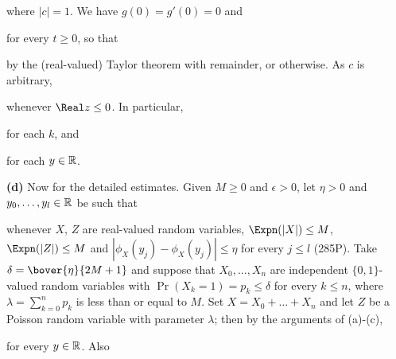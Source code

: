 {

\noindent where $|c|=1$.   We have $g(0)=g'(0)=0$ and


\noindent for every $t\ge 0$, so that


\noindent by the (real-valued) Taylor theorem with remainder, or
otherwise.   As $c$ is arbitrary,


\noindent whenever $\Real z\le 0$.   In particular,


\noindent for each $k$, and


\noindent for each $y\in\Bbb R$.

\medskip

{\bf (d)} Now for the detailed estimates.   Given $M\ge 0$ and
$\epsilon>0$, let $\eta>0$ and $y_0,\ldots,y_l\in\Bbb R$ be such that


\noindent whenever $X$, $Z$ are real-valued random variables,
$\Expn(|X|)\le M$, $\Expn(|Z|)\le M$ and
$|\phi_X(y_j)-\phi_X(y_j)|\le\eta$ for every $j\le l$ (285P).   Take
$\delta=\bover{\eta}{2M+1}$
and suppose that $X_0,\ldots,X_n$ are independent
$\{0,1\}$-valued random variables with $\Pr(X_k=1)=p_k\le\delta$ for
every $k\le n$, where $\lambda=\sum_{k=0}^np_k$ is less than or equal to
$M$.   Set $X=X_0+\ldots+X_n$
and let $Z$ be a Poisson random variable with parameter $\lambda$;  then
by the arguments of (a)-(c),


\noindent for every $y\in\Bbb R$.   Also



}
